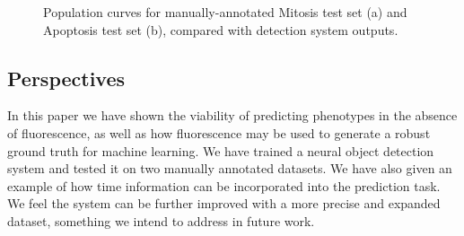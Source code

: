 \begin{figure}%
    \centering
    \qquad
    \caption{Population curves for manually-annotated Mitosis test set (a) and Apoptosis test set (b), compared with detection system outputs.}
    \label{fig:populations}
\end{figure}

\subsection{Perspectives}
\label{subsec:perspectives}

In this paper we have shown the viability of predicting phenotypes in the absence of  fluorescence, as well as how fluorescence may be used to generate a robust ground truth for machine learning. We have trained a neural object detection system and tested it on two manually annotated datasets. We have also given an example of how time information can be incorporated into the prediction task. We feel the system can be further improved with a more precise and expanded dataset, something we intend to address in future work.


